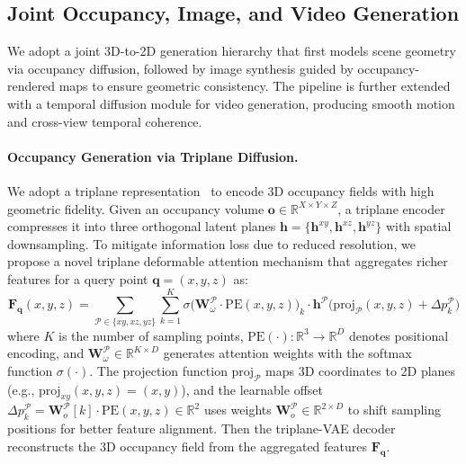 \subsection{Joint Occupancy, Image, and Video Generation}
\label{sec_generation}
We adopt a joint 3D-to-2D generation hierarchy that first models scene geometry via occupancy diffusion, followed by image synthesis guided by occupancy-rendered maps to ensure geometric consistency. The pipeline is further extended with a temporal diffusion module for video generation, producing smooth motion and cross-view temporal coherence.

\paragraph{Occupancy Generation via Triplane Diffusion.}
We adopt a triplane representation~\cite{Triplane} to encode 3D occupancy fields with high geometric fidelity. Given an occupancy volume $\mathbf{o} \in \mathbb{R}^{X \times Y \times Z}$, a triplane encoder compresses it into three orthogonal latent planes $\mathbf{h} = \{\mathbf{h}^{xy}, \mathbf{h}^{xz}, \mathbf{h}^{yz}\}$ with spatial downsampling. To mitigate information loss due to reduced resolution, we propose a novel triplane deformable attention mechanism that aggregates richer features for a query point $\mathbf{q} = (x, y, z)$ as:
\vspace{-1mm}
\begin{equation}
\mathbf{F}_\mathbf{q}(x, y, z) = \sum_{\mathcal{P} \in \{xy, xz, yz\}} 
\sum_{k=1}^K 
\sigma\big(\mathbf{W}_\omega^\mathcal{P} \cdot \text{PE}(x, y, z)\big)_k 
\cdot \mathbf{h}^\mathcal{P}\Big(
\text{proj}_\mathcal{P}(x, y, z) + 
\Delta p_k^\mathcal{P}
\Big)
\end{equation}
where $K$ is the number of sampling points, $\text{PE}(\cdot): \mathbb{R}^3 \rightarrow \mathbb{R}^D$ denotes positional encoding, and $\mathbf{W}_\omega^\mathcal{P} \in \mathbb{R}^{K \times D}$ generates attention weights with the softmax function $\sigma(\cdot)$. The projection function $\text{proj}_\mathcal{P}$ maps 3D coordinates to 2D planes (e.g., $\text{proj}_{xy}(x, y, z) = (x, y)$), and the learnable offset $\Delta p_k^\mathcal{P} = \mathbf{W}_o^\mathcal{P}[k] \cdot \text{PE}(x, y, z) \in \mathbb{R}^2$ uses weights $\mathbf{W}_o^\mathcal{P} \in \mathbb{R}^{2 \times D}$ to shift sampling positions for better feature alignment. Then the triplane-VAE decoder reconstructs the 3D occupancy field from the aggregated features $\textbf{F}_\textbf{q}$.

